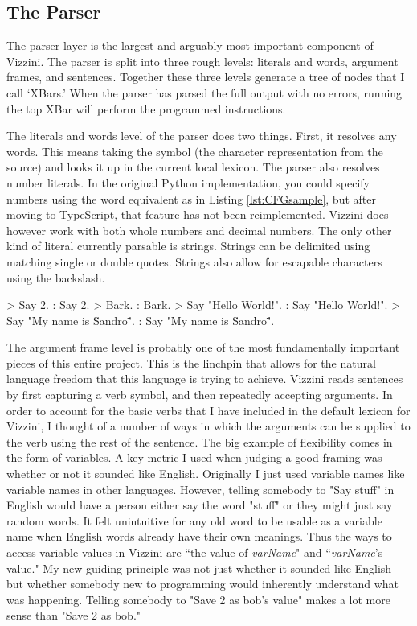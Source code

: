 \documentclass[titlepage]{article}
\newcommand{\lstRef}[1]{Listing \ref{lst:#1}}
\newcommand{\langName}{Vizzini}
\begin{document}
\subsection*{The Parser}
The parser layer is the largest and arguably most important component of \langName{}. The parser is split into three rough levels: literals and words, argument frames, and sentences. Together these three levels generate a tree of nodes that I call `XBars.' When the parser has parsed the full output with no errors, running the top XBar will perform the programmed instructions.

The literals and words level of the parser does two things. First, it resolves any words. This means taking the symbol (the character representation from the source) and looks it up in the current local lexicon. The parser also resolves number literals. In the original Python implementation, you could specify numbers using the word equivalent as in \lstRef{CFGsample}, but after moving to TypeScript, that feature has not been reimplemented. \langName{} does however work with both whole numbers and decimal numbers. The only other kind of literal currently parsable is strings. Strings can be delimited using matching single or double quotes. Strings also allow for escapable characters using the backslash.

\begin{codeblock}[caption={Lexer and Literal Parsing},label={lst:literalExample}]
> Say 2.
: {Say}{ }{2}{.}
> Bark.
: {Bark}{.}
> Say "Hello World!".
: {Say}{ }{"Hello World!"}{.}
> Say "My name is \"Sandro\"".
: {Say}{ }{"My name is \"Sandro\""}{.}
\end{codeblock}

The argument frame level is probably one of the most fundamentally important pieces of this entire project. This is the linchpin that allows for the natural language freedom that this language is trying to achieve. \langName{} reads sentences by first capturing a verb symbol, and then repeatedly accepting arguments. In order to account for the basic verbs that I have included in the default lexicon for \langName{}, I thought of a number of ways in which the arguments can be supplied to the verb using the rest of the sentence. The big example of flexibility comes in the form of variables. A key metric I used when judging a good framing was whether or not it sounded like English. Originally I just used variable names like variable names in other languages. However, telling somebody to "Say stuff" in English would have a person either say the word "stuff" or they might just say random words. It felt unintuitive for any old word to be usable as a variable name when English words already have their own meanings. Thus the ways to access variable values in \langName{} are ``the value of \textlangle\textit{varName}\textrangle" and ``\textlangle\textit{varName}\textrangle's value." My new guiding principle was not just whether it sounded like English but whether somebody new to programming would inherently understand what was happening. Telling somebody to "Save 2 as bob's value" makes a lot more sense than "Save 2 as bob."
\end{document}
